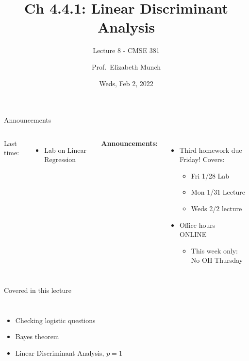 \documentclass[aspectratio=169,usenames,dvipsnames]{beamer}
\begin{document}
\title[]{Ch 4.4.1: Linear Discriminant Analysis}
\subtitle{Lecture 8 - CMSE 381}
\date{Weds, Feb 2, 2022}



\author[Dr.~Munch]{Prof.~Elizabeth Munch}

\begin{frame}
 \titlepage


\end{frame}
\begin{frame}[c]{Announcements}

\begin{columns}
\centering

	Last time:
	\begin{itemize}
		\item Lab on Linear Regression
	\end{itemize}
\centering

\textbf{Announcements:}
	\begin{itemize}
		\item Third homework due Friday! Covers:
		\begin{itemize}
			\item Fri 1/28 Lab
			\item Mon 1/31 Lecture
			\item Weds 2/2 lecture
		\end{itemize}
		\item Office hours - ONLINE
		\begin{itemize}
			\item This week only: No OH Thursday
		\end{itemize}
	\end{itemize}
\end{columns}

\end{frame}
\begin{frame}[c]{Covered in this lecture }

\begin{columns}
\centering
\begin{itemize}
	\item Checking logistic questions
	\item Bayes theorem
	\item Linear Discriminant Analysis, $p=1$
\end{itemize}
\centering

\end{columns}

\end{frame}
\end{document}
